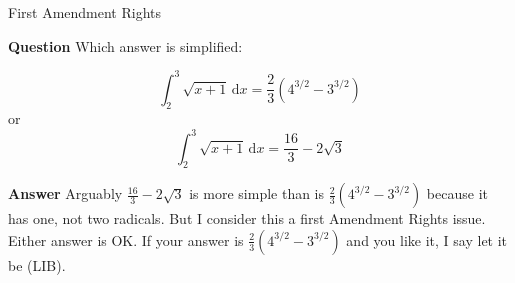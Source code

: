 \documentclass[fleqn]{beamer}
\theoremstyle{definition}
\begin{document}
\begin{frame}{First Amendment Rights}

\textbf{Question} Which answer is simplified:

\begin{equation*}
    \int_2^3 \sqrt{x+1} \, \mathrm{d}x =  \frac{2}{3} \left(4^{3/2} - 3^{3/2}\right)
\end{equation*}
or 
\begin{equation*}
    \int_2^3 \sqrt{x+1} \, \mathrm{d}x =  \frac{16}{3} - 2 \sqrt{3}
\end{equation*}

\textbf{Answer} Arguably $\frac{16}{3} - 2 \sqrt{3}$ is more simple 
than is $\frac{2}{3} \left(4^{3/2} - 3^{3/2}\right)$ because it 
has one, not two radicals. But I consider this a first Amendment 
Rights issue. Either answer is OK. If your answer is $\frac{2}{3} \left(4^{3/2} - 3^{3/2}\right)$
and you like it, I say let it be (LIB).
\end{frame}
    
\end{document}
